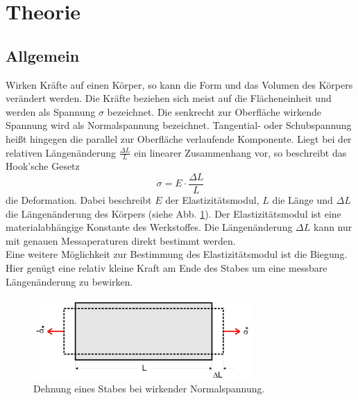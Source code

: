 \section{Theorie}
\label{sec:Theorie}
\subsection{Allgemein}
Wirken Kräfte auf einen Körper, so kann die Form und das Volumen des Körpers verändert werden.
Die Kräfte beziehen sich meist auf die Flächeneinheit und werden als Spannung $\sigma$ bezeichnet.
Die senkrecht zur Oberfläche wirkende Spannung wird als Normalspannung bezeichnet.
Tangential- oder Schubspannung heißt hingegen die parallel zur Oberfläche verlaufende Komponente.
Liegt bei der relativen Längenänderung $\frac{\Delta L}{L}$ ein linearer Zusammenhang vor, so beschreibt das Hook'sche Gesetz
\begin{equation}
    \sigma = E \cdot \frac{\Delta L}{L}
\end{equation}
die Deformation.
Dabei beschreibt $E$ der Elastizitätsmodul, $L$ die Länge und $\Delta L$ die Längenänderung des Körpers (siehe Abb. \ref{fig:spannung}).
Der Elastizitätsmodul ist eine materialabhängige Konstante des Werkstoffes.
Die Längenänderung $\Delta L$ kann nur mit genauen Messaperaturen direkt bestimmt werden.\\
Eine weitere Möglichkeit zur Bestimmung des Elastizitätsmodul ist die Biegung.
Hier genügt eine relativ kleine Kraft am Ende des Stabes um eine messbare Längenänderung zu bewirken.
\begin{figure}
    \centering
    \includegraphics[width=0.75\textwidth]{content/data/spannung.jpg}
    \caption{Dehnung eines Stabes bei wirkender Normalspannung.\cite{anleitung}}
    \label{fig:spannung}
\end{figure}
